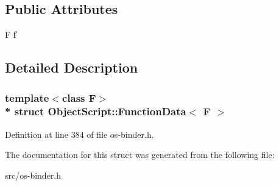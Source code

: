 \subsection*{Public Attributes}
\begin{DoxyCompactItemize}
\item 
F {\bfseries f}\hypertarget{struct_object_script_1_1_function_data_a8dbce35dafde08b7e56ee441eb7d0100}{}\label{struct_object_script_1_1_function_data_a8dbce35dafde08b7e56ee441eb7d0100}

\end{DoxyCompactItemize}


\subsection{Detailed Description}
\subsubsection*{template$<$class F$>$\\*
struct Object\+Script\+::\+Function\+Data$<$ F $>$}



Definition at line 384 of file os-\/binder.\+h.



The documentation for this struct was generated from the following file\+:\begin{DoxyCompactItemize}
\item 
src/os-\/binder.\+h\end{DoxyCompactItemize}
